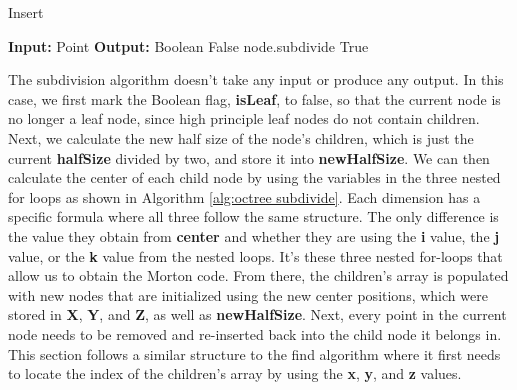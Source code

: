 \documentclass[conference]{IEEEtran}
\begin{document}
\begin{algorithm}[h]
    \caption{Insert}\label{alg:octree insert}
    \begin{algorithmic}[1]
        \Statex \textbf{Input:} Point
        \Statex \textbf{Output:} Boolean
        \State \Return False
        \EndIf
        \State node.subdivide
        \EndIf
        \State \Return True
    \end{algorithmic}
\end{algorithm}

The subdivision algorithm doesn’t take any input or produce any output. In this case, we first mark the Boolean flag, \textbf{isLeaf}, to false, so that the current node is no longer a leaf node, since high principle leaf nodes do not contain children. Next, we calculate the new half size of the node’s children, which is just the current \textbf{halfSize} divided by two, and store it into \textbf{newHalfSize}. We can then calculate the center of each child node by using the variables in the three nested for loops as shown in Algorithm \ref{alg:octree subdivide}. Each dimension has a specific formula where all three follow the same structure. The only difference is the value they obtain from \textbf{center} and whether they are using the \textbf{i} value, the \textbf{j} value, or the \textbf{k} value from the nested loops. It’s these three nested for-loops that allow us to obtain the Morton code. From there, the children’s array is populated with new nodes that are initialized using the new center positions, which were stored in \textbf{X}, \textbf{Y}, and \textbf{Z}, as well as \textbf{newHalfSize}. Next, every point in the current node needs to be removed and re-inserted back into the child node it belongs in. This section follows a similar structure to the find algorithm where it first needs to locate the index of the children's array by using the \textbf{x}, \textbf{y}, and \textbf{z} values.
\end{document}
